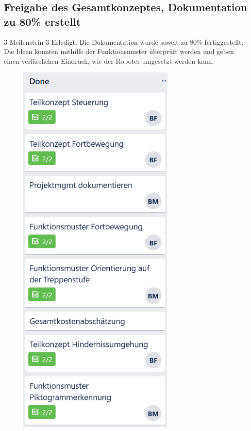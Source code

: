     
    
    
    
    
    
    
    
\subsection*{Freigabe des Gesamtkonzeptes, Dokumentation zu 80\% erstellt}
\workday
    {3}
    {\ok Meilenstein 3 Erledigt.}
    {
      Die Dokumentation wurde soweit zu 80\% fertiggestellt. 
    }
    {
      Die Ideen konnten mithilfe der Funktionsmuster überprüft werden und geben einen verlässlichen Eindruck, wie der Roboter umgesetzt werden kann.
    }

    
    
        \begin{figure}[H]
  \centering
  \begin{minipage}[t]{0.45\linewidth}
  \includegraphics[width=0.7\textwidth]{img/Trello/Trello-Bord_3_Nr1.PNG}

\end{minipage}
\end{figure}
